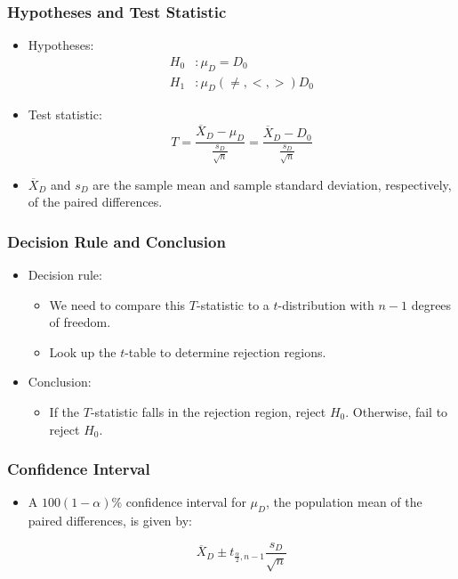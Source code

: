 \documentclass[12pt]{beamer}
\begin{document}
	\begin{frame}
		\frametitle{Hypotheses and Test Statistic}
		
		\begin{itemize}[label={\color{blue}$\blacktriangleright$}]
			\item Hypotheses:
			\[
			\begin{aligned}
				H_0 &: \mu_D = D_0 \\
				H_1 &: \mu_D (\neq, <, >) D_0
			\end{aligned}
			\]
			
			\item Test statistic:
			\[
			T = \frac{\overline{X}_D - \mu_D}{\frac{s_D}{\sqrt{n}}} = \frac{\overline{X}_D - D_0}{\frac{s_D}{\sqrt{n}}}
			\]
			
			\item $\overline{X}_D$ and $s_D$ are the sample mean and sample standard deviation, respectively, of the paired differences.
		\end{itemize}
		
	\end{frame}
	\begin{frame}
		\frametitle{Decision Rule and Conclusion}
		
		\begin{itemize}[label={\color{blue}$\blacktriangleright$}]
			\item Decision rule:
			\begin{itemize}[label={\color{blue}$\blacktriangleright$}]
				\item We need to compare this $T$-statistic to a $t$-distribution with $n - 1$ degrees of freedom.
				\item Look up the $t$-table to determine rejection regions.
			\end{itemize}
			\item Conclusion:
			\begin{itemize}[label={\color{blue}$\blacktriangleright$}]
				\item If the $T$-statistic falls in the rejection region, reject $H_0$. Otherwise, fail to reject $H_0$.
			\end{itemize}
		\end{itemize}
		
	\end{frame}
	\begin{frame}
		\frametitle{Confidence Interval}
		
		\begin{itemize}[label={\color{blue}$\blacktriangleright$}]
			\item A $100(1 - \alpha)\%$ confidence interval for $\mu_D$, the population mean of the paired differences, is given by:
			
			\vspace{0.5cm}
			
			\[
			\overline{X}_D \pm t_{\frac{\alpha}{2},n-1} \frac{s_D}{\sqrt{n}}
			\]
		\end{itemize}
		
	\end{frame}
\end{document}
